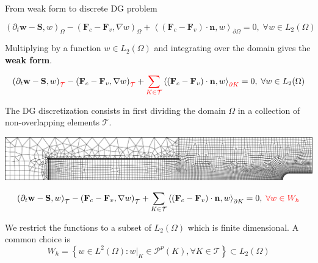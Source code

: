 \documentclass[24pt,t,table, aspectratio=169]{beamer}
\newcommand{\vecF}{\mathbf{F}}
\newcommand{\vecS}{\mathbf{S}}
\newcommand{\vecw}{\mathbf{w}}
\newcommand{\tesselation}{\mathcal{T}}
\newcommand{\vecn}{\mathbf{n}}
\begin{document}
\begin{frame}{From weak form to discrete DG problem}

{
\begin{equation*}
\left(\partial_t \vecw - \vecS, w \right)_{\Omega} - \left(\vecF_{c} - \vecF_{v}, \nabla w \right)_{\Omega} + \left\langle \left(\vecF_{c} - \vecF_{v}\right) \cdot \vecn, w \right\rangle_{\partial \Omega} = 0, \; \forall w \in L_2(\Omega)
\end{equation*}

Multiplying by a function $w \in L_2(\Omega)$ and integrating over the domain gives the \textbf{weak form}.
}

{
\begin{equation*}
\left(\partial_t \vecw - \vecS, w \right)_{\textcolor{red}{\tesselation}} - \left(\vecF_{c} - \vecF_{v}, \nabla w \right)_{\textcolor{red}{\tesselation}} + \textcolor{red}{\sum_{K \in \tesselation}} \left\langle \left(\vecF_{c} - \vecF_{v}\right) \cdot \vecn, w \right\rangle_{\textcolor{red}{\partial K}} = 0, \; \forall w \in L_2(\Omega)
\end{equation*}

The DG discretization consists in first dividing the domain $\Omega$ in a collection of non-overlapping elements $\mathcal{T}$.

\begin{center}
\includegraphics[width=.8\linewidth]{./Grid_Independence_mesh_probe_cropped.pdf}
\end{center}

}

{
\begin{equation*}
\left(\partial_t \vecw - \vecS, w \right)_{\tesselation} - \left(\vecF_{c} - \vecF_{v}, \nabla w \right)_{\tesselation} + \sum_{K \in \tesselation} \left\langle \left(\vecF_{c} - \vecF_{v}\right) \cdot \vecn, w \right\rangle_{\partial K} = 0, \; \textcolor{red}{\forall w \in W_h}
\end{equation*}

We restrict the functions to a subset of $L_2(\Omega)$ which is finite dimensional. A common choice is
\begin{equation*}
W_h = \left\{w \in L^2(\Omega) : w|_K \in \mathcal{P}^p(K), \forall K\in \tesselation\right\} \subset L_2(\Omega)
\end{equation*}
}


\end{frame}
\end{document}
